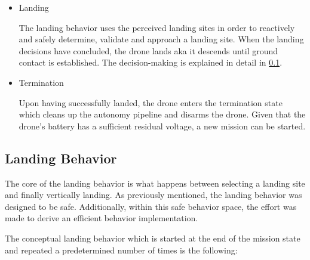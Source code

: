\begin{itemize}
    \item Landing
    
    The landing behavior uses the perceived landing sites in order to reactively and safely determine, validate and approach a landing site. When the landing decisions have concluded, the drone lands aka it descends until ground contact is established. The decision-making is explained in detail in \cref{subsec:landing_behavior}. 

    \item Termination

    Upon having successfully landed, the drone enters the termination state which cleans up the autonomy pipeline and disarms the drone. Given that the drone's battery has a sufficient residual voltage, a new mission can be started.
\end{itemize}

\subsection{Landing Behavior}\label{subsec:landing_behavior}

The core of the landing behavior is what happens between selecting a landing site and finally vertically landing. As previously mentioned, the landing behavior was designed to be safe. Additionally, within this safe behavior space, the effort was made to derive an efficient behavior implementation.

The conceptual landing behavior which is started at the end of the mission state and repeated a predetermined number of times is the following:


